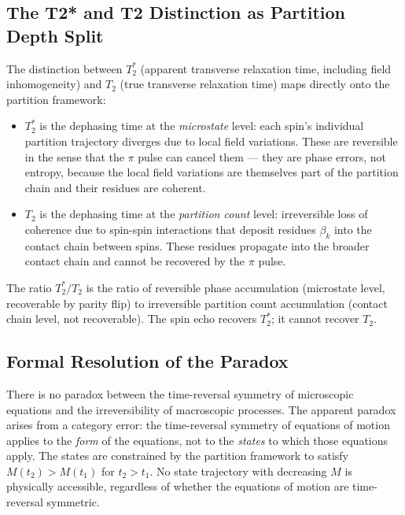 \subsection{The T2* and T2 Distinction as Partition Depth Split}
\label{subsec:T2_split}

The distinction between $T_2^*$ (apparent transverse relaxation time, including
field inhomogeneity) and $T_2$ (true transverse relaxation time) maps directly
onto the partition framework:

\begin{itemize}
    \item $T_2^*$ is the dephasing time at the \emph{microstate} level: each
          spin's individual partition trajectory diverges due to local field
          variations. These are reversible in the sense that the $\pi$ pulse
          can cancel them --- they are phase errors, not entropy, because the
          local field variations are themselves part of the partition chain and
          their residues are coherent.

    \item $T_2$ is the dephasing time at the \emph{partition count} level:
          irreversible loss of coherence due to spin-spin interactions that
          deposit residues $\beta_k$ into the contact chain between spins.
          These residues propagate into the broader contact chain and cannot
          be recovered by the $\pi$ pulse.
\end{itemize}

The ratio $T_2^*/T_2$ is the ratio of reversible phase accumulation (microstate
level, recoverable by parity flip) to irreversible partition count accumulation
(contact chain level, not recoverable). The spin echo recovers $T_2^*$; it
cannot recover $T_2$.

\subsection{Formal Resolution of the Paradox}
\label{subsec:formal_resolution}

\begin{theorem}
\label{thm:resolution}
There is no paradox between the time-reversal symmetry of microscopic equations
and the irreversibility of macroscopic processes. The apparent paradox arises
from a category error: the time-reversal symmetry of equations of motion applies
to the \emph{form} of the equations, not to the \emph{states} to which those
equations apply. The states are constrained by the partition framework to satisfy
$M(t_2) > M(t_1)$ for $t_2 > t_1$. No state trajectory with decreasing $M$ is
physically accessible, regardless of whether the equations of motion are
time-reversal symmetric.
\end{theorem}

